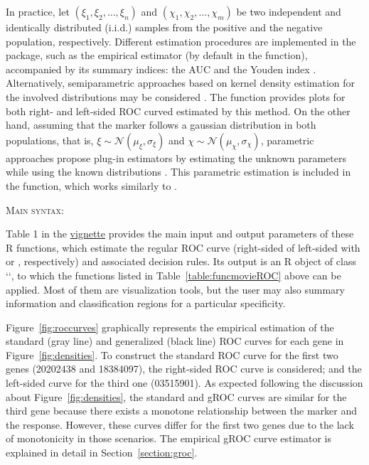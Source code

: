 In practice, let $(\xi_1, \xi_2, \dots, \xi_n)$  and $(\chi_1, \chi_2, \dots, \chi_m)$ be two independent and identically distributed (i.i.d.) samples from the positive and the negative population, respectively. Different estimation procedures are implemented in the  package, such as the empirical estimator \citep{Hsieh1996} (by default in the  function), accompanied by its summary indices: the AUC and the Youden index \citep{Youden1950}. Alternatively, semiparametric approaches based on kernel density estimation for the involved distributions may be considered \citep{Zou1997}. The  function provides plots for both right- and left-sided ROC curved estimated by this method. On the other hand, assuming that the marker follows a gaussian distribution in both populations, that is, $\xi \sim \mathcal{N}(\mu_\xi, \sigma_\xi)$ and $\chi \sim \mathcal{N}(\mu_\chi, \sigma_\chi)$, parametric approaches propose plug-in estimators by estimating the unknown parameters while using the known distributions \citep{Hanley1988}. This parametric estimation is included in the  function, which works similarly to .

\textsc{Main syntax:} \par \hspace{3mm}
 \hspace{8mm} 

\noindent Table 1 in the \href{https://cran.r-project.org/web/packages/movieROC/vignettes/movieROC_vignette.pdf}{vignette} provides the main input and output parameters of these R functions, which estimate the regular ROC curve (right-sided of left-sided with  or , respectively) and associated decision rules. Its output is an R object of class ``, to which the functions listed in Table~\ref{table:funcmovieROC} above can be applied. Most of them are visualization tools, but the user may also  summary information and  classification regions for a particular specificity.

Figure~\ref{fig:roccurves} graphically represents the empirical estimation of the standard (gray line) and generalized (black line) ROC curves for each gene in Figure~\ref{fig:densities}. To construct the standard ROC curve for the first two genes (20202438 and 18384097), the right-sided ROC curve is considered; and the left-sided curve for the third one (03515901). As expected following the discussion about Figure~\ref{fig:densities}, the standard and gROC curves are similar for the third gene because there exists a monotone relationship between the marker and the response. However, these curves differ for the first two genes due to the lack of monotonicity in those scenarios. The empirical gROC curve estimator is explained in detail in Section~\ref{section:groc}.

